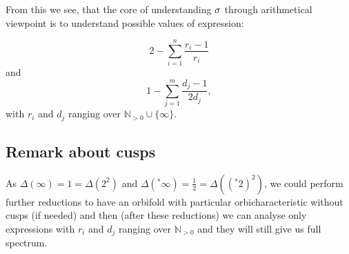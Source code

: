 From this we see, that the core of understanding ${\sigma}$ through arithmetical viewpoint 
is to understand possible values of expression:

\begin{equation}\label{S2_sum}
2 - \sum_{i=1}^n \frac{r_i-1}{r_i}
\end{equation}
and 
\begin{equation}\label{D2_sum}
1 - \sum_{j=1}^m \frac{d_j-1}{2d_j},
\end{equation}
with $r_i$ and $d_j$ ranging over $\mathbb{N}_{>0}\cup \{\infty\}$.
\subsection{Remark about cusps}
As $\Delta(\infty) = 1 = \Delta(2^2)$ and $\Delta(^*\infty) = \frac{1}{2} = \Delta((^*2)^2)$, 
we could perform further reductions to have an orbifold with 
particular orbicharacteristic without cusps (if needed) and then (after these reductions) 
we can analyse only expressions with $r_i$ and $d_j$ ranging over $\mathbb{N}_{>0}$ and 
they will still give us full spectrum. 

